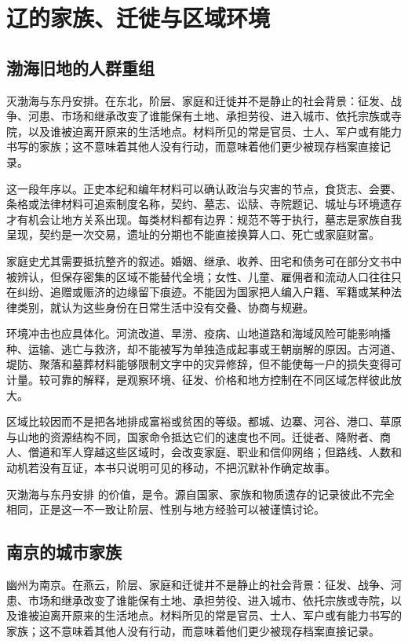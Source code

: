 \section{辽的家族、迁徙与区域环境}

\subsection{渤海旧地的人群重组}

灭渤海与东丹安排。在东北，阶层、家庭和迁徙并不是静止的社会背景：征发、战争、河患、市场和继承改变了谁能保有土地、承担劳役、进入城市、依托宗族或寺院，以及谁被迫离开原来的生活地点。材料所见的常是官员、士人、军户或有能力书写的家族；这不意味着其他人没有行动，而意味着他们更少被现存档案直接记录。

这一段年序以。正史本纪和编年材料可以确认政治与灾害的节点，食货志、会要、条格或法律材料可追索制度名称，契约、墓志、讼牍、寺院题记、城址与环境遗存才有机会让地方关系出现。每类材料都有边界：规范不等于执行，墓志是家族自我呈现，契约是一次交易，遗址的分期也不能直接换算人口、死亡或家庭财富。

家庭史尤其需要抵抗整齐的叙述。婚姻、继承、收养、田宅和债务可在部分文书中被辨认，但保存密集的区域不能替代全境；女性、儿童、雇佣者和流动人口往往只在纠纷、追赠或赈济的边缘留下痕迹。不能因为国家把人编入户籍、军籍或某种法律类别，就认为这些身份在日常生活中没有交叠、协商与规避。

环境冲击也应具体化。河流改道、旱涝、疫病、山地道路和海域风险可能影响播种、运输、逃亡与救济，却不能被写为单独造成起事或王朝崩解的原因。古河道、堤防、聚落和墓葬材料能够限制文字中的灾异修辞，但不能使每一户的损失变得可计量。较可靠的解释，是观察环境、征发、价格和地方控制在不同区域怎样彼此放大。

区域比较因而不是把各地排成富裕或贫困的等级。都城、边寨、河谷、港口、草原与山地的资源结构不同，国家命令抵达它们的速度也不同。迁徙者、降附者、商人、僧道和军人穿越这些区域时，会改变家庭、职业和信仰网络；但路线、人数和动机若没有互证，本书只说明可见的移动，不把沉默补作确定故事。

灭渤海与东丹安排 的价值，是令。源自国家、家族和物质遗存的记录彼此不完全相同，正是这一不一致让阶层、性别与地方经验可以被谨慎讨论。

\subsection{南京的城市家族}

幽州为南京。在燕云，阶层、家庭和迁徙并不是静止的社会背景：征发、战争、河患、市场和继承改变了谁能保有土地、承担劳役、进入城市、依托宗族或寺院，以及谁被迫离开原来的生活地点。材料所见的常是官员、士人、军户或有能力书写的家族；这不意味着其他人没有行动，而意味着他们更少被现存档案直接记录。

